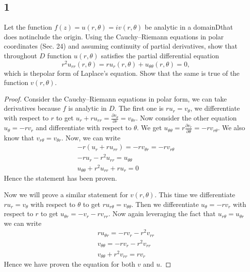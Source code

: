 \documentclass{article}
\newcommand{\partiald}[2]{\frac{\partial #1}{\partial #2}}
\begin{document}
    \subsection*{1}
    Let  the  function $f(z) = u(r,\theta) = iv(r, \theta)$ be  analytic  in  
    a  domainDthat  does  notinclude the origin. Using the Cauchy–Riemann equations 
    in polar coordinates (Sec. 24) and assuming continuity of partial derivatives, 
    show that throughout $D$ function $u(r,\theta)$ satisfies the partial 
    differential equation $$r^2u_{rr}(r,\theta) = ru_r(r,\theta) + u_{\theta\theta}(r,\theta) = 0,$$
    which is thepolar form of Laplace’s equation. Show that the same is true of 
    the function $v(r, \theta)$.
    \begin{proof}
        Consider the Cauchy–Riemann equations in polar form, we can take derivatives
        because $f$ is analytic in $D$. The first one is
        $ru_r = v_\theta$, we differentiate with respect to $r$ to get
        $u_r + ru_{rr} = \partiald{v_\theta}{r} = v_{\theta r}$. Now consider the
        other equation $u_\theta = -rv_r$ and differentiate with respect to $\theta$.
        We get $u_{\theta\theta} = r\partiald{v_r}{\theta} = -rv_{r\theta}$. We 
        also know that $v_{r\theta} = v_{\theta r}$. Now, we can write
        \begin{gather*}
            -r(u_r + ru_{rr}) = -rv_{\theta r} = -rv_{r\theta} \\
            -ru_r - r^2u_{rr} = u_{\theta\theta} \\
            u_{\theta\theta} + r^2u_{rr} + ru_r = 0
        \end{gather*}
        Hence the statement has been proven.

        \vspace{0.25cm}
        Now we will prove a similar statement for $v(r,\theta)$. This time we
        differentiate $ru_r = v_\theta$ with respect to $\theta$ to get
        $ru_{r\theta} = v_{\theta\theta}$. Then we differentiate $u_\theta = -rv_r$
        with respect to $r$ to get $u_{\theta r} = -v_r - rv_{rr}$. Now 
        again leveraging the fact that $u_{r\theta} = u_{\theta r}$ we can write
        \begin{gather*}
            ru_{\theta r} = -rv_r - r^2v_{rr} \\
            v_{\theta \theta} = -rv_r - r^2v_{rr} \\
            v_{\theta\theta} +r^2v_{rr} = rv_r
        \end{gather*}
        Hence we have proven the equation for both $v$ and $u$.
    \end{proof}
\end{document}
